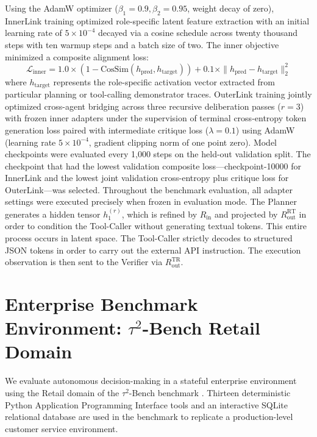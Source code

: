 \documentclass[a4paper, 12pt]{report}
\begin{document}
Using the AdamW optimizer ($\beta_1 = 0.9, \beta_2 = 0.95$, weight decay of zero), InnerLink training optimized role-specific latent feature extraction with an initial learning rate of $5 \times 10^{-4}$ decayed via a cosine schedule across twenty thousand steps with ten warmup steps and a batch size of two. The inner objective minimized a composite alignment loss:
\begin{equation}
    \mathcal{L}_{\text{inner}} = 1.0 \times \left(1 - \text{CosSim}(h_{\text{pred}}, h_{\text{target}})\right) + 0.1 \times \| h_{\text{pred}} - h_{\text{target}} \|_2^2
\end{equation}
where $h_{\text{target}}$ represents the role-specific activation vector extracted from particular planning or tool-calling demonstrator traces. OuterLink training jointly optimized cross-agent bridging across three recursive deliberation passes ($r=3$) with frozen inner adapters under the supervision of terminal cross-entropy token generation loss paired with intermediate critique loss ($\lambda = 0.1$) using AdamW (learning rate $5 \times 10^{-4}$, gradient clipping norm of one point zero). Model checkpoints were evaluated every 1,000 steps on the held-out validation split. The checkpoint that had the lowest validation composite loss---checkpoint-10000 for InnerLink and the lowest joint validation cross-entropy plus critique loss for OuterLink---was selected. Throughout the benchmark evaluation, all adapter settings were executed precisely when frozen in evaluation mode. The Planner generates a hidden tensor $h_1^{(r)}$, which is refined by $R_{\text{in}}$ and projected by $R_{\text{out}}^{\text{RT}}$ in order to condition the Tool-Caller without generating textual tokens. This entire process occurs in latent space. The Tool-Caller strictly decodes to structured JSON tokens in order to carry out the external API instruction. The execution observation is then sent to the Verifier via $R_{\text{out}}^{\text{TR}}$.

\section{Enterprise Benchmark Environment: $\tau^2$-Bench Retail Domain}
We evaluate autonomous decision-making in a stateful enterprise environment using the Retail domain of the $\tau^2$-Bench benchmark \cite{sierra2024tau}. Thirteen deterministic Python Application Programming Interface tools and an interactive SQLite relational database are used in the benchmark to replicate a production-level customer service environment.
\end{document}
